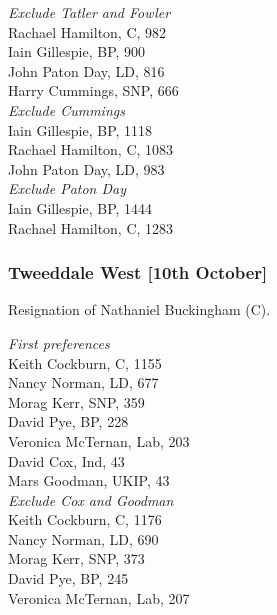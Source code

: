 \documentclass[a4paper,openany,10pt]{book}
\begin{document}
\emph{{Exclude Tatler and Fowler}}\\
Rachael Hamilton, C, 982\\
Iain Gillespie, BP, 900\\
John Paton Day, LD, 816\\
Harry Cummings, SNP, 666\\




\emph{Exclude Cummings}\\
Iain Gillespie, BP, 1118\\
Rachael Hamilton, C, 1083\\
John Paton Day, LD, 983\\




\emph{Exclude Paton Day}\\
Iain Gillespie, BP, 1444\\
Rachael Hamilton, C, 1283\\




\subsubsection*{Tweeddale West \hspace*{\fill}\nolinebreak[1]%
\enspace\hspace*{\fill}
[10th October]}


Resignation of Nathaniel Buckingham (C).



\emph{First preferences}\\
Keith Cockburn, C, 1155\\
Nancy Norman, LD, 677\\
Morag Kerr, SNP, 359\\
David Pye, BP, 228\\
Veronica McTernan, Lab, 203\\
David Cox, Ind, 43\\
Mars Goodman, UKIP, 43\\




\emph{Exclude Cox and Goodman}\\
Keith Cockburn, C, 1176\\
Nancy Norman, LD, 690\\
Morag Kerr, SNP, 373\\
David Pye, BP, 245\\
Veronica McTernan, Lab, 207\\
\end{document}
